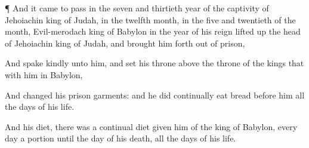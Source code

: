 {\par }{\PP {}¶ And it came to pass in the
seven and
thirtieth
year of the
captivity of
Jehoiachin
king of
Judah, in the
twelfth
month, in the
five and
twentieth
{} of the
month,
{}
Evil-merodach
king of
Babylon in the
{}
year of his
reign lifted
up the
head of
Jehoiachin
king of
Judah, and brought him
forth out of
prison,

And
spake
kindly unto him, and
set his
throne
above the
throne of the
kings that
{} with him in
Babylon,

And
changed his
prison
garments: and he did
continually
eat
bread
before him all the
days of his
life.

And
{} his
diet, there was a
continual
diet
given him of the
king of
Babylon,
every
day a
portion until the
day of his
death, all the
days of his
life.


\par }